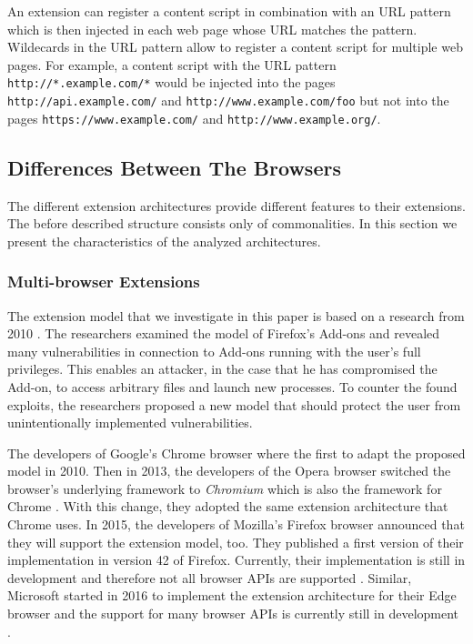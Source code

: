 	An extension can register a content script in combination with an URL pattern which is then injected in each web page whose URL matches the pattern. Wildecards in the URL pattern allow to register a content script for multiple web pages. For example, a content script with the URL pattern \texttt{http://*.example.com/*} would be injected into the pages \texttt{http://api.example.com/} and \texttt{http://www.example.com/foo} but not into the pages \texttt{https://www.example.com/} and \texttt{http://www.example.org/}.



\subsection{Differences Between The Browsers}

	The different extension architectures provide different features to their extensions. The before described structure consists only of commonalities. In this section we present the characteristics of the analyzed architectures.
	
\subsubsection{Multi-browser Extensions}

	The extension model that we investigate in this paper is based on a research from 2010 \cite{Barth10protectingbrowsers}. The researchers examined the model of Firefox's Add-ons and revealed many vulnerabilities in connection to Add-ons running with the user's full privileges. This enables an attacker, in the case that he has compromised the Add-on, to access arbitrary files and launch new processes. To counter the found exploits, the researchers proposed a new model that should protect the user from unintentionally implemented vulnerabilities.
	
	The developers of Google's Chrome browser where the first to adapt the proposed model in 2010. Then in 2013, the developers of the Opera browser switched the browser's underlying framework to \textit{Chromium} which is also the framework for Chrome \cite{operaBlogSwitchToChromium}. With this change, they adopted the same extension architecture that Chrome uses. In 2015, the developers of Mozilla's Firefox browser announced that they will support the extension model, too. They published a first version of their implementation in version 42 of Firefox. Currently, their implementation is still in development and therefore not all browser APIs are supported \cite{mozillaWebExtensionStatus}. Similar, Microsoft started in 2016 to implement the extension architecture for their Edge browser and the support for many browser APIs is currently still in development \cite{edgeBrowserApiStatus}.
		
